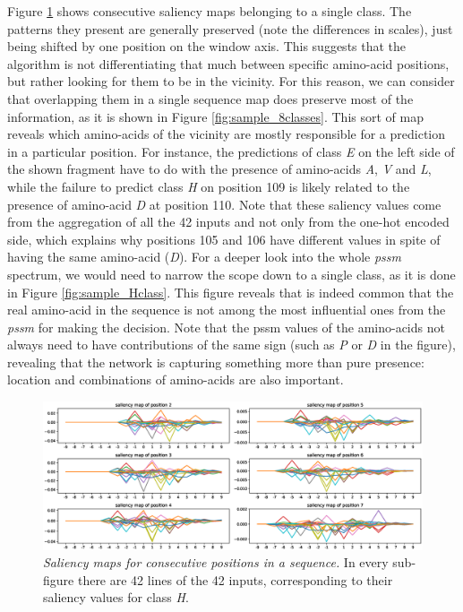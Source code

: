	Figure \ref{fig:sliding} shows consecutive saliency maps belonging to a single class. The patterns they present are generally preserved (note the differences in scales), just being shifted by one position on the window axis. This suggests that the algorithm is not differentiating that much between specific amino-acid positions, but rather looking for them to be in the vicinity. For this reason, we can consider that overlapping them in a single sequence map does preserve most of the information, as it is shown in Figure \ref{fig:sample_8classes}. This sort of map reveals which amino-acids of the vicinity are mostly responsible for a prediction in a particular position. For instance, the  predictions of class \textit{E} on the left side of the shown fragment have to do with the presence of amino-acids \textit{A}, \textit{V} and \textit{L}, while the failure to predict class \textit{H} on position 109 is likely related to the presence of amino-acid \textit{D} at position 110. Note that these saliency values come from the aggregation of all the 42 inputs and not only from the one-hot encoded side, which explains why positions 105 and 106 have different values in spite of having the same amino-acid (\textit{D}). For a deeper look into the whole \textit{pssm} spectrum, we would need to narrow the scope down to a single class, as it is done in Figure \ref{fig:sample_Hclass}. This figure reveals that is indeed common that the real amino-acid in the sequence is not among the most influential ones from the \textit{pssm} for making the decision. Note that the pssm values of the amino-acids not always need to have contributions of the same sign (such as \textit{P} or \textit{D} in the figure), revealing that the network is capturing something more than pure presence: location and combinations of amino-acids are also important.
	
	\begin{figure}
	\centering
	\includegraphics[width=1\linewidth]{Figures/sliding}
	\caption{\textit{Saliency maps for consecutive positions in a sequence.} In every sub-figure there are 42 lines of the 42 inputs, corresponding to their saliency values for class \textit{H}.}
	\label{fig:sliding}
	\end{figure}

